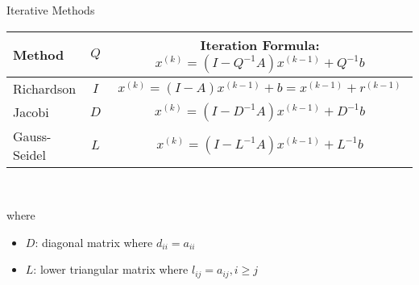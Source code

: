 \documentclass[9pt, serif]{beamer}
\newlength{\wideitemsep}
\let\olditem\item
\renewcommand{\item}{\setlength{\itemsep}{\wideitemsep}\olditem}
\newcommand{\bi}{\begin{itemize}}
\newcommand{\ei}{\end{itemize}}
\begin{document}
\begin{frame}{Iterative Methods}
    \pause
    \begin{center}
        \begin{tabular}{l|c|c}
            Method & $Q$ & Iteration Formula: $x^{(k)} = (I-Q^{-1}A)x^{(k-1)}+Q^{-1}b$ \\ \hline \hline
            Richardson & $I$ & $x^{(k)} = (I-A)x^{(k-1)}+b = x^{(k-1)}+r^{(k-1)}$ \\
            Jacobi & $D$ & $x^{(k)} = (I-D^{-1}A)x^{(k-1)}+D^{-1}b$ \\
            Gauss-Seidel & $L$ & $x^{(k)} = (I-L^{-1}A)x^{(k-1)}+L^{-1}b$
        \end{tabular}
        \\[5mm]
    \end{center} 
    where
    \bi
        \item $D$: diagonal matrix where $d_{ii} = a_{ii}$
        \item $L$: lower triangular matrix where $l_{ij} = a_{ij}, i \ge j$
    \ei
\end{frame}
\end{document}
